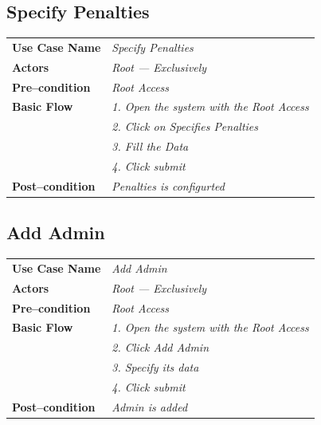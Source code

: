 \documentclass{article}
\begin{document}
\subsection{Specify Penalties}
    \begin{tabular}{ l | l }
    \toprule
      \rowcolor{LightCyan}
      \textbf{Use Case Name}    & \textit{Specify Penalties}\\
      \textbf{Actors}           & \textit{Root --- Exclusively}\\
      \rowcolor{LightCyan}
      \textbf{Pre--condition}   & \textit{Root Access}\\
      \textbf{Basic Flow}       & \textit{1. Open the system with the Root Access}\\
                                & \textit{2. Click on Specifies Penalties}\\
                                & \textit{3. Fill the Data}\\
                                & \textit{4. Click submit}\\
      \rowcolor{LightCyan}
      \textbf{Post--condition}  & \textit{Penalties is configurted}\\
    \toprule
    \end{tabular}

\subsection{Add Admin}
    \begin{tabular}{ l | l }
    \toprule
      \rowcolor{LightCyan}
      \textbf{Use Case Name}    & \textit{Add Admin}\\
      \textbf{Actors}           & \textit{Root --- Exclusively}\\
      \rowcolor{LightCyan}
      \textbf{Pre--condition}   & \textit{Root Access}\\
      \textbf{Basic Flow}       & \textit{1. Open the system with the Root Access}\\
                                & \textit{2. Click Add Admin}\\
                                & \textit{3. Specify its data}\\
                                & \textit{4. Click submit}\\
      \rowcolor{LightCyan}
      \textbf{Post--condition}  & \textit{Admin is added}\\
    \toprule
    \end{tabular}
\end{document}
